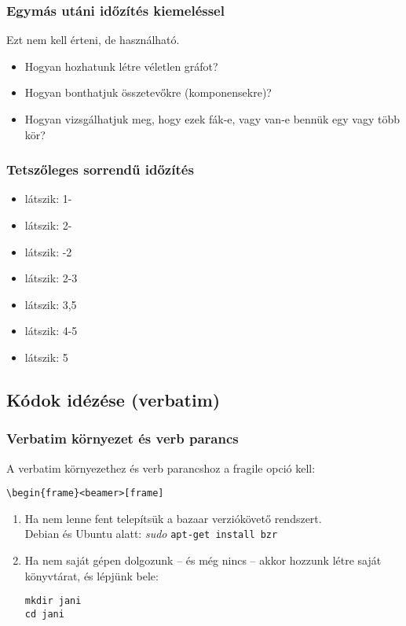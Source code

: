 \documentclass[ignorenonframetext]{beamer}
\begin{document}
\begin{frame}
  \frametitle{Egymás utáni időzítés kiemeléssel}
  Ezt nem kell érteni, de használható.

  \begin{itemize}
    \item <+-| alert@+> Hogyan hozhatunk létre véletlen gráfot?
    \item <+-| alert@+> Hogyan bonthatjuk összetevőkre (komponensekre)?
    \item <+-| alert@+> Hogyan vizsgálhatjuk meg, hogy ezek fák-e, vagy
	van-e bennük egy vagy több kör?
  \end{itemize}
\end{frame}

\begin{frame}
  \frametitle{Tetszőleges sorrendű időzítés}

  \begin{itemize}
     \item<1-> látszik: 1-
     \item<2-> látszik: 2-
     \item<-2> látszik: -2
     \item<2-3> látszik: 2-3
     \item<3,5> látszik: 3,5
     \item<4-5> látszik: 4-5
     \item<5> látszik: 5
  \end{itemize}

\end{frame}
\subsection[Verbatim]{Kódok idézése (verbatim)}

\begin{frame}[fragile]
  \frametitle{Verbatim környezet és verb parancs}

A verbatim környezethez és verb parancshoz a fragile opció kell:

\verb|\begin{frame}<beamer>[frame]|

  \begin{enumerate}
    \item Ha nem lenne fent telepítsük a bazaar verziókövető rendszert.\\
    Debian és Ubuntu alatt: \emph{sudo} \verb|apt-get install bzr|
    \item Ha nem saját gépen dolgozunk -- és még nincs -- akkor hozzunk
létre saját könyvtárat, és lépjünk bele:
\begin{verbatim}
mkdir jani
cd jani
\end{verbatim}
  \end{enumerate}
\end{frame}
\end{document}
